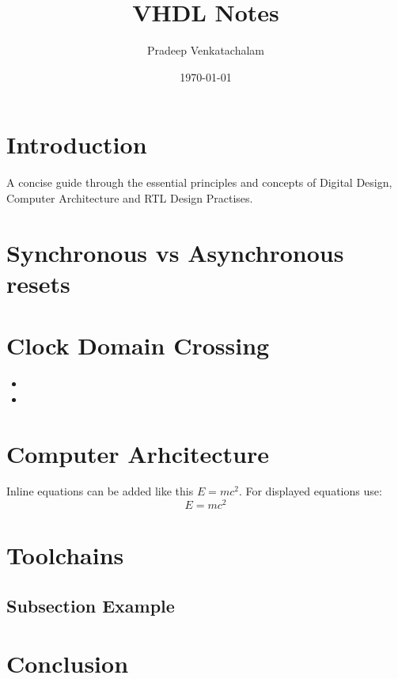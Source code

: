 \documentclass[twocolumn,60pt]{article}
\begin{document}
\title{VHDL Notes}
\author{Pradeep Venkatachalam}
\date{\today}

\maketitle

\section{Introduction}
A concise guide through the essential principles and concepts of Digital Design, Computer Architecture and RTL Design Practises.

\section{Synchronous vs Asynchronous resets}
\lipsum[1-2] %

\section{Clock Domain Crossing}
\begin{itemize}
    \item \lipsum[6]
    \item \lipsum[7]
\end{itemize}

\section{Computer Arhcitecture}
Inline equations can be added like this $E=mc^2$.
For displayed equations use:
\begin{equation}
    E=mc^2
\end{equation}

\section{Toolchains}
\lipsum[3] %

\subsection{Subsection Example}
\lipsum[4] %

\section{Conclusion}
\lipsum[5] %
\end{document}
